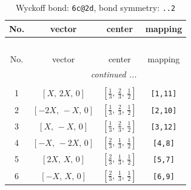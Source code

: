 \documentclass[fleqn,8pt]{jsarticle}
\begin{document}
\renewcommand{\arraystretch}{1.2}
\begin{longtable}{cccc}
\caption{Wyckoff bond: {\tt 6c@2d}, bond symmetry: {\tt ..2}}
 \\
 \hline \hline
No. & vector & center & mapping \\ \hline \endfirsthead

\multicolumn{3}{l}{\tablename\ \thetable{}} \\
 \hline \hline
No. & vector & center & mapping \\ \hline \endhead

 \hline \hline
\multicolumn{3}{r}{\footnotesize\it continued ...} \\ \endfoot

 \hline \hline
\multicolumn{3}{r}{} \\ \endlastfoot

1 & $\left[ X,\, 2 X,\, 0 \right]$ & $\left[ \frac{1}{3},\, \frac{2}{3},\, \frac{1}{2} \right]$ & {\tt [1,11]} \\ \hline
2 & $\left[ - 2 X,\, - X,\, 0 \right]$ & $\left[ \frac{1}{3},\, \frac{2}{3},\, \frac{1}{2} \right]$ & {\tt [2,10]} \\ \hline
3 & $\left[ X,\, - X,\, 0 \right]$ & $\left[ \frac{1}{3},\, \frac{2}{3},\, \frac{1}{2} \right]$ & {\tt [3,12]} \\ \hline
4 & $\left[ - X,\, - 2 X,\, 0 \right]$ & $\left[ \frac{2}{3},\, \frac{1}{3},\, \frac{1}{2} \right]$ & {\tt [4,8]} \\ \hline
5 & $\left[ 2 X,\, X,\, 0 \right]$ & $\left[ \frac{2}{3},\, \frac{1}{3},\, \frac{1}{2} \right]$ & {\tt [5,7]} \\ \hline
6 & $\left[ - X,\, X,\, 0 \right]$ & $\left[ \frac{2}{3},\, \frac{1}{3},\, \frac{1}{2} \right]$ & {\tt [6,9]} \\
\end{longtable}
\renewcommand{\arraystretch}{1.2}
\end{document}
